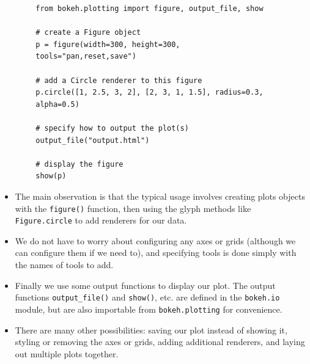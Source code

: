 \documentclass[12pt, a4paper]{report}
\begin{document}
{
	\large
	\begin{framed}
		\begin{verbatim}
		from bokeh.plotting import figure, output_file, show
		
		# create a Figure object
		p = figure(width=300, height=300,  
		tools="pan,reset,save")
		
		# add a Circle renderer to this figure
		p.circle([1, 2.5, 3, 2], [2, 3, 1, 1.5], radius=0.3,
		alpha=0.5)
		
		# specify how to output the plot(s)
		output_file("output.html")
		
		# display the figure
		show(p)
		\end{verbatim}
	\end{framed}
}
\newpage
\begin{itemize}
	\item The main observation is that the typical usage involves creating plots objects with the \texttt{figure()} function, then using the glyph methods like \texttt{Figure.circle} to add renderers for our data. 
	\item We do not have to worry about configuring any axes or grids (although we can configure them if we need to), and specifying tools is done simply with the names of tools to add. 
	
	
	\item Finally we use some output functions to display our plot. The output functions \texttt{output\_file()} and \texttt{show()}, etc. are defined in the \texttt{bokeh.io} module, but are also importable from \texttt{bokeh.plotting} for convenience.
	
	
	\item There are many other possibilities: saving our plot instead of showing it, styling or removing the axes or grids, adding additional renderers, and laying out multiple plots together.
\end{itemize}



\newpage
\end{document}
